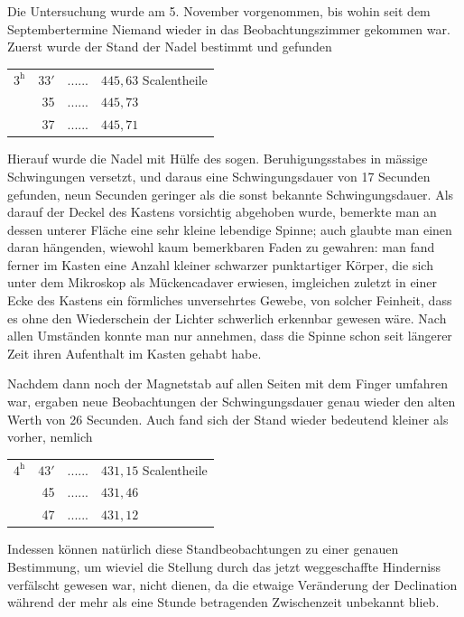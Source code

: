 Die Untersuchung wurde am 5. November vorgenommen, bis wohin seit dem Septembertermine Niemand wieder in das Beobachtungszimmer gekommen war. Zuerst wurde der Stand der Nadel bestimmt und gefunden
\begin{center}
\begin{tabular}{rrc l}
$3^{\mathrm h}$&$33'$&.\quad.\quad.\quad.\quad.\quad.&$445{,}63$ Scalentheile\\
&35&.\quad.\quad.\quad.\quad.\quad.&$445{,}73$\\
&37&.\quad.\quad.\quad.\quad.\quad.&$445{,}71$
\end{tabular}
\end{center}

\par
\clearpage
{}
Hierauf wurde die Nadel mit Hülfe des sogen. Beruhigungsstabes in mässige Schwingungen versetzt, und daraus eine Schwingungsdauer von 17 Secunden gefunden, neun Secunden geringer als die sonst bekannte Schwingungsdauer. Als darauf der Deckel des Kastens vorsichtig abgehoben wurde, bemerkte man an dessen unterer Fläche eine sehr kleine lebendige Spinne; auch glaubte man einen daran hängenden, wiewohl kaum bemerkbaren Faden zu gewahren: man fand ferner im Kasten eine Anzahl kleiner schwarzer punktartiger Körper, die sich unter dem Mikroskop als Mückencadaver erwiesen, imgleichen zuletzt in einer Ecke des Kastens ein förmliches unversehrtes Gewebe, von solcher Feinheit, dass es ohne den Wiederschein der Lichter schwerlich erkennbar gewesen wäre. Nach allen Umständen konnte man nur annehmen, dass die Spinne schon seit längerer Zeit ihren Aufenthalt im Kasten gehabt habe.

Nachdem dann noch der Magnetstab auf allen Seiten mit dem Finger umfahren war, ergaben neue Beobachtungen der Schwingungsdauer genau wieder den alten Werth von 26 Secunden. Auch fand sich der Stand wieder bedeutend kleiner als vorher, nemlich
\begin{center}
\begin{tabular}{rrc l}
$4^{\mathrm h}$&$43'$&.\quad.\quad.\quad.\quad.\quad.&$431{,}15$ Scalentheile\\
&45&.\quad.\quad.\quad.\quad.\quad.&$431{,}46$\\
&47&.\quad.\quad.\quad.\quad.\quad.&$431{,}12$
\end{tabular}
\end{center}
Indessen können natürlich diese Standbeobachtungen zu einer genauen Bestimmung, um wieviel die Stellung durch das jetzt weggeschaffte Hinderniss verfälscht gewesen war, nicht dienen, da die etwaige Veränderung der Declination während der mehr als eine Stunde betragenden Zwischenzeit unbekannt blieb.

